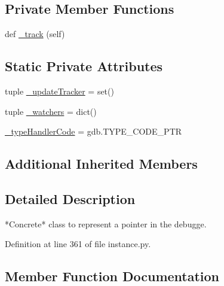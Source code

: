 \subsection*{Private Member Functions}
\begin{DoxyCompactItemize}
\item 
def \hyperlink{classmemoryoracle_1_1instance_1_1Pointer_a2cc9e298adaad8bed089d90186fcde8a}{\+\_\+track} (self)
\end{DoxyCompactItemize}
\subsection*{Static Private Attributes}
\begin{DoxyCompactItemize}
\item 
tuple \hyperlink{classmemoryoracle_1_1instance_1_1Pointer_acff47dcd377cdf74928c5d1858d43fa5}{\+\_\+update\+Tracker} = set()
\item 
tuple \hyperlink{classmemoryoracle_1_1instance_1_1Pointer_a77e0a4c5d2637dcf1e43861c5805acda}{\+\_\+watchers} = dict()
\item 
\hyperlink{classmemoryoracle_1_1instance_1_1Pointer_a9668f3c920788f907283902e134de2b1}{\+\_\+type\+Handler\+Code} = gdb.\+T\+Y\+P\+E\+\_\+\+C\+O\+D\+E\+\_\+\+P\+T\+R
\end{DoxyCompactItemize}
\subsection*{Additional Inherited Members}


\subsection{Detailed Description}
\begin{DoxyVerb}*Concrete* class to represent a pointer in the debugge.
\end{DoxyVerb}
 

Definition at line 361 of file instance.\+py.



\subsection{Member Function Documentation}
\hypertarget{classmemoryoracle_1_1instance_1_1Pointer_a2cc9e298adaad8bed089d90186fcde8a}{}
